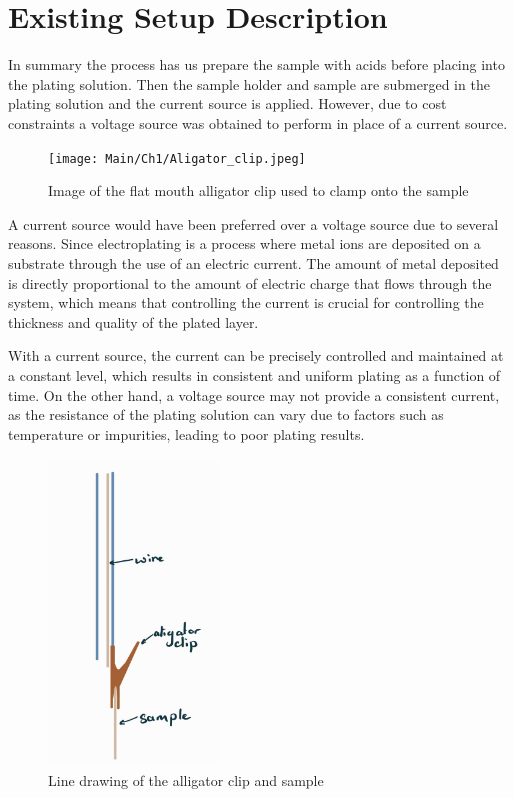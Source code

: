 \newpage

\section{Existing Setup Description}

In summary the process has us prepare the sample with acids before placing into the plating solution. Then the sample holder and sample are submerged in the plating solution and the current source is applied. However, due to cost constraints a voltage source was obtained to perform in place of a current source.

\begin{figure}
    \centering
    \texttt{[image: Main/Ch1/Aligator\_clip.jpeg]}
    \caption{Image of the flat mouth alligator clip used to clamp onto the sample}
\end{figure}

A current source would have been preferred over a voltage source due to several reasons. Since electroplating is a process where metal ions are deposited on a substrate through the use of an electric current. The amount of metal deposited is directly proportional to the amount of electric charge that flows through the system, which means that controlling the current is crucial for controlling the thickness and quality of the plated layer.

With a current source, the current can be precisely controlled and maintained at a constant level, which results in consistent and uniform plating as a function of time. On the other hand, a voltage source may not provide a consistent current, as the resistance of the plating solution can vary due to factors such as temperature or impurities, leading to poor plating results.

\begin{figure}
    \centering
    \includegraphics[width=0.4\textwidth]{Main/Ch1/Current Sample holder.png}
    \caption{Line drawing of the alligator clip and sample }
\end{figure}

